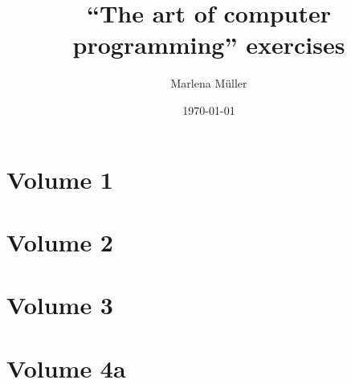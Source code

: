 \documentclass[a4paper, 12pt]{scrbook}
\begin{document}
\title{``The art of computer programming''  exercises}
\author{Marlena Müller}
\date{\today}

\maketitle
\tableofcontents
\listoftodos

\part{Volume 1}



\part{Volume 2}


\part{Volume 3}


\part{Volume 4a}

\end{document}
